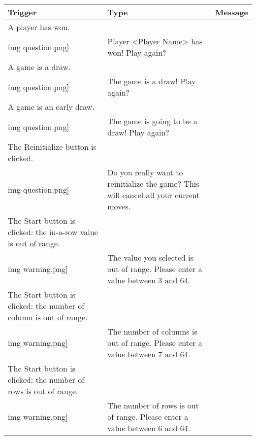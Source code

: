 \begin{table}[H]
  \centering
  \begin{longtable}{|p{}
                    |p{}
                    |p{}|}
    \hline
    \textbf{Trigger} & \textbf{Type} & \textbf{Message} \\
    \hline
    \hline

    A player has won.                                           &
    \texttt{[image: \\img question.png]} &
    Player <Player Name> has won! Play again?                   \\\hline

    A game is a draw.                                           &
    \texttt{[image: \\img question.png]} &
    The game is a draw! Play again?                             \\\hline

    A game is an early draw.                                    &
    \texttt{[image: \\img question.png]} &
    The game is going to be a draw! Play again?                 \\\hline

    The Reinitialize button is clicked.                            &
    \texttt{[image: \\img question.png]}    &
    Do you really want to reinitialize the game? This will cancel
    all your current moves.                                        \\\hline

    The Start button is clicked: the in-a-row value is out of range. &
    \texttt{[image: \\img warning.png]}       &
    The value you selected is out of range. Please enter a value
    between 3 and 64.                                                \\\hline

    The Start button is clicked: the number of column is out of range.  &
    \texttt{[image: \\img warning.png]}          &
    The number of columns is out of range. Please enter a value between
    7 and 64.                                                           \\\hline

    The Start button is clicked: the number of rows is out of range. &
    \texttt{[image: \\img warning.png]}       &
    The number of rows is out of range. Please enter a value between
    6 and 64.                                                        \\\hline


\end{longtable}
\end{table}
